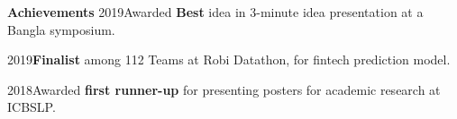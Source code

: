 \begin{rSection}{\textbf{Achievements} }
{2019\hspace{1em}}{Awarded \textbf{Best} idea in 3-minute idea presentation at a Bangla symposium.} \vspace{-0.5em}

{2019\hspace{1em}}{\bf Finalist} among 112 Teams{ at Robi Datathon, for fintech prediction model.} \vspace{-0.5em}

{2018\hspace{1em}}{Awarded \textbf{first runner-up} for presenting posters for academic research at ICBSLP. } \vspace{-0.5em}







\end{rSection}
